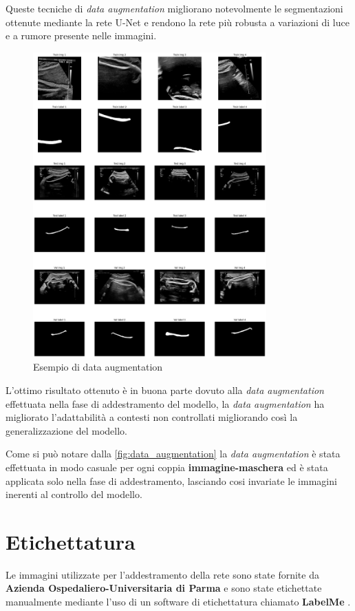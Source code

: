 Queste tecniche di \textit{data augmentation} migliorano notevolmente le
segmentazioni ottenute mediante la rete U-Net e rendono la rete più robusta a
variazioni di luce e a rumore presente nelle immagini.


\begin{figure}
    \centering
    \includegraphics[width=0.8\textwidth]{Immagini/data_augmentation.png}
    \caption{Esempio di data augmentation}
    \label{fig:data_augmentation}
\end{figure}

L'ottimo risultato ottenuto è in buona parte dovuto alla \textit{data
augmentation} effettuata nella fase di addestramento del modello, la
\textit{data augmentation} ha migliorato l'adattabilità a contesti non
controllati migliorando così la generalizzazione del modello.

Come si può notare dalla \autoref{fig:data_augmentation} la \textit{data
augmentation} è stata effettuata in modo casuale per ogni coppia
\textbf{immagine-maschera} ed è stata applicata solo nella fase di
addestramento, lasciando cosi invariate le immagini inerenti al controllo del
modello.

\section{Etichettatura} Le immagini utilizzate per l'addestramento della rete
sono state fornite da \textbf{Azienda Ospedaliero-Universitaria di Parma} e sono
state etichettate manualmente mediante l'uso di un software di etichettatura
chiamato \textbf{LabelMe} \cite{labelme}.

